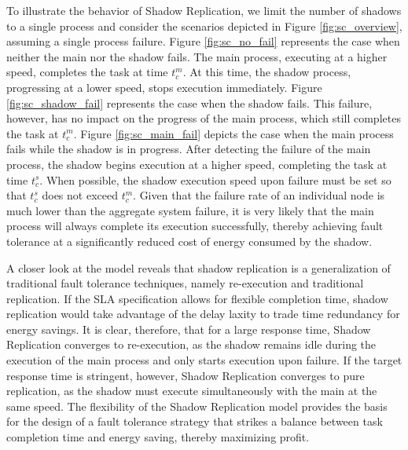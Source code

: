 To illustrate the behavior of Shadow Replication, we limit the number of shadows to a single process and consider the scenarios depicted in Figure \ref{fig:sc_overview}, assuming a single process failure. Figure \ref{fig:sc_no_fail} represents the case when neither the main nor the shadow fails. The main process, executing
at a higher speed, completes the task at time $t_c^m$. At this time, the shadow process, progressing at a lower speed, stops execution immediately. Figure \ref{fig:sc_shadow_fail} represents the case when the shadow fails. This failure, however, has no impact on the progress of the main process, which still completes the task at $t_c^m$. Figure \ref{fig:sc_main_fail} depicts the case when the main process fails while the shadow is in progress. After detecting the failure of the main process, the shadow begins execution at a higher speed, completing the task at time $t_c^s$. When possible, the shadow execution speed upon failure must be set so that $t_c^s$ does not exceed $t_c^m$. Given that the failure rate of an individual node is much lower than
the aggregate system failure, it is very likely that the main process
will always complete its execution successfully, thereby achieving fault tolerance at a significantly reduced cost of energy consumed by the shadow. %


A closer look at the model reveals that shadow
replication is a generalization of traditional fault tolerance
techniques, namely re-execution and traditional replication. If the
SLA specification allows for flexible completion time, shadow
replication would take advantage of the delay laxity to trade time
redundancy for energy savings. It is clear, therefore, that for a
large response time, Shadow Replication converges to re-execution, as
the shadow remains idle during the execution of the main process and
only starts execution upon failure. If the target response time is
stringent, however, Shadow Replication converges to pure replication,
as the shadow must execute simultaneously with the main at the same
speed. The flexibility of the Shadow Replication model provides the
basis for the design of a fault tolerance strategy that strikes a
balance between task completion time and energy saving, thereby
maximizing profit.


